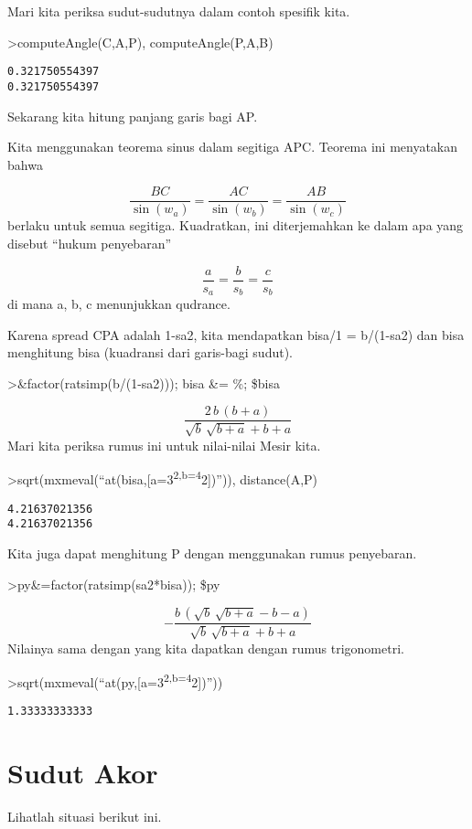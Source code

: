 \documentclass[
]{book}
\begin{document}
Mari kita periksa sudut-sudutnya dalam contoh spesifik kita.

\textgreater computeAngle(C,A,P), computeAngle(P,A,B)

\begin{verbatim}
0.321750554397
0.321750554397
\end{verbatim}

Sekarang kita hitung panjang garis bagi AP.

Kita menggunakan teorema sinus dalam segitiga APC. Teorema ini menyatakan bahwa

\[\frac{BC}{\sin(w_a)} = \frac{AC}{\sin(w_b)} = \frac{AB}{\sin(w_c)}\]berlaku untuk semua segitiga. Kuadratkan, ini diterjemahkan ke dalam apa yang disebut ``hukum penyebaran''

\[\frac{a}{s_a} = \frac{b}{s_b} = \frac{c}{s_b}\]di mana a, b, c menunjukkan qudrance.

Karena spread CPA adalah 1-sa2, kita mendapatkan bisa/1 = b/(1-sa2) dan bisa menghitung bisa (kuadransi dari garis-bagi sudut).

\textgreater\&factor(ratsimp(b/(1-sa2))); bisa \&= \%; \$bisa

\[\frac{2\,b\,\left(b+a\right)}{\sqrt{b}\,\sqrt{b+a}+b+a}\]Mari kita periksa rumus ini untuk nilai-nilai Mesir kita.

\textgreater sqrt(mxmeval(``at(bisa,{[}a=3\textsuperscript{2,b=4}2{]})'')), distance(A,P)

\begin{verbatim}
4.21637021356
4.21637021356
\end{verbatim}

Kita juga dapat menghitung P dengan menggunakan rumus penyebaran.

\textgreater py\&=factor(ratsimp(sa2*bisa)); \$py

\[-\frac{b\,\left(\sqrt{b}\,\sqrt{b+a}-b-a\right)}{\sqrt{b}\,\sqrt{b+
 a}+b+a}\]Nilainya sama dengan yang kita dapatkan dengan rumus trigonometri.

\textgreater sqrt(mxmeval(``at(py,{[}a=3\textsuperscript{2,b=4}2{]})''))

\begin{verbatim}
1.33333333333
\end{verbatim}

\section{Sudut Akor}\label{sudut-akor}

Lihatlah situasi berikut ini.
\end{document}
